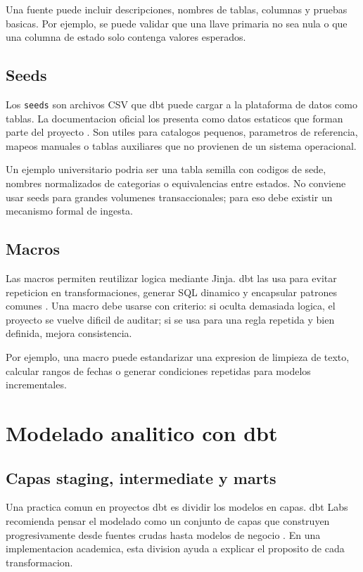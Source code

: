 \documentclass[12pt]{article}
\begin{document}
Una fuente puede incluir descripciones, nombres de tablas, columnas y pruebas basicas. Por ejemplo, se puede validar que una llave primaria no sea nula o que una columna de estado solo contenga valores esperados.

\subsection{Seeds}
Los \texttt{seeds} son archivos CSV que dbt puede cargar a la plataforma de datos como tablas. La documentacion oficial los presenta como datos estaticos que forman parte del proyecto \cite{dbt_seeds}. Son utiles para catalogos pequenos, parametros de referencia, mapeos manuales o tablas auxiliares que no provienen de un sistema operacional.

Un ejemplo universitario podria ser una tabla semilla con codigos de sede, nombres normalizados de categorias o equivalencias entre estados. No conviene usar seeds para grandes volumenes transaccionales; para eso debe existir un mecanismo formal de ingesta.

\subsection{Macros}
Las macros permiten reutilizar logica mediante Jinja. dbt las usa para evitar repeticion en transformaciones, generar SQL dinamico y encapsular patrones comunes \cite{dbt_jinja_macros}. Una macro debe usarse con criterio: si oculta demasiada logica, el proyecto se vuelve dificil de auditar; si se usa para una regla repetida y bien definida, mejora consistencia.

Por ejemplo, una macro puede estandarizar una expresion de limpieza de texto, calcular rangos de fechas o generar condiciones repetidas para modelos incrementales.

\section{Modelado analitico con dbt}
\subsection{Capas staging, intermediate y marts}
Una practica comun en proyectos dbt es dividir los modelos en capas. dbt Labs recomienda pensar el modelado como un conjunto de capas que construyen progresivamente desde fuentes crudas hasta modelos de negocio \cite{dbt_staging_best_practices}. En una implementacion academica, esta division ayuda a explicar el proposito de cada transformacion.
\end{document}
